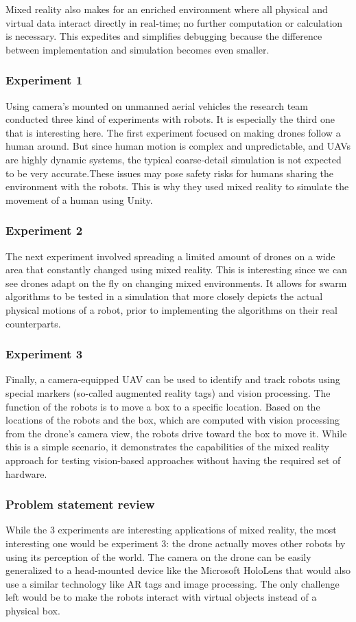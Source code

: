 \documentclass{article}
\begin{document}
Mixed reality also makes for an enriched environment where all physical and virtual data interact directly in real-time; no further computation or calculation is necessary. This expedites and simplifies debugging because the difference between implementation and simulation becomes even smaller. 

\subsubsection{Experiment 1}
Using camera's mounted on unmanned aerial vehicles the research team conducted three kind of experiments with robots. It is especially the third one that is interesting here.
The first experiment focused on making drones follow a human around. But since human motion is complex and unpredictable, and UAVs are highly dynamic systems, the typical coarse-detail simulation is not expected to be very accurate.These issues may pose safety risks for humans sharing the environment with the robots. 
This is why they used mixed reality to simulate the movement of a human using Unity.

\subsubsection{Experiment 2}
The next experiment involved spreading a limited amount of drones on a wide area that constantly changed using mixed reality. This is interesting since we can see drones adapt on the fly on changing mixed environments. It allows for swarm algorithms to be tested in a simulation that more closely depicts the actual physical motions of a robot, prior to implementing the algorithms on their real counterparts. 

\subsubsection{Experiment 3}
Finally, a camera-equipped UAV can be used to identify and track robots using special markers (so-called augmented reality tags) and vision processing. The function of the robots is to move a box to a specific location. Based on the locations of the robots and the box, which are computed with vision processing from the drone's camera view, the robots drive toward the box to move it. 
While this is a simple scenario, it demonstrates the capabilities of the mixed reality approach for testing vision-based approaches without having the required set of hardware.

\subsubsection{Problem statement review}
While the 3 experiments are interesting applications of mixed reality, the most interesting one would be experiment 3: the drone actually moves other robots by using its perception of the world. The camera on the drone can be easily generalized to a head-mounted device like the Microsoft HoloLens that would also use a similar technology like AR tags and image processing.
The only challenge left would be to make the robots interact with virtual objects instead of a physical box. 
\end{document}
